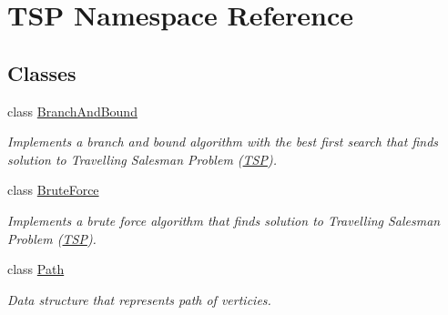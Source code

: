 \hypertarget{namespace_t_s_p}{}\section{T\+SP Namespace Reference}
\label{namespace_t_s_p}
\subsection*{Classes}
\begin{DoxyCompactItemize}
\item 
class \hyperlink{class_t_s_p_1_1_branch_and_bound}{Branch\+And\+Bound}
\begin{DoxyCompactList}\small\item\em Implements a branch and bound algorithm with the best first search that finds solution to Travelling Salesman Problem (\hyperlink{namespace_t_s_p}{T\+SP}). \end{DoxyCompactList}\item 
class \hyperlink{class_t_s_p_1_1_brute_force}{Brute\+Force}
\begin{DoxyCompactList}\small\item\em Implements a brute force algorithm that finds solution to Travelling Salesman Problem (\hyperlink{namespace_t_s_p}{T\+SP}). \end{DoxyCompactList}\item 
class \hyperlink{class_t_s_p_1_1_path}{Path}
\begin{DoxyCompactList}\small\item\em Data structure that represents path of verticies. \end{DoxyCompactList}\end{DoxyCompactItemize}
